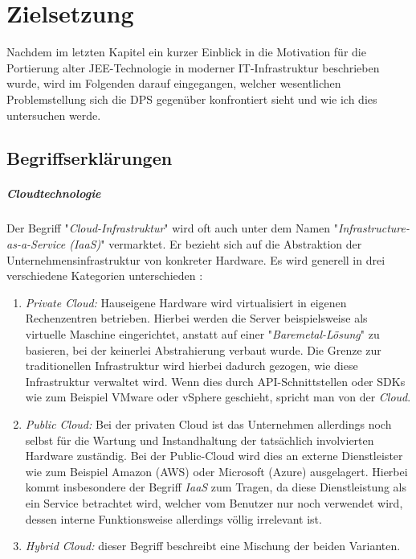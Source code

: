\chapter{Zielsetzung}

Nachdem im letzten Kapitel ein kurzer Einblick in die Motivation für die Portierung alter JEE-Technologie in moderner IT-Infrastruktur beschrieben wurde, wird im Folgenden darauf eingegangen, welcher wesentlichen Problemstellung sich die DPS gegenüber konfrontiert sieht und wie ich dies untersuchen werde.

\section{Begriffserklärungen}

\paragraph{Cloudtechnologie}
Der Begriff "\emph{Cloud-Infrastruktur}" wird oft auch unter dem Namen "\emph{Infrastructure-as-a-Service (IaaS)}" vermarktet. Er bezieht sich auf die Abstraktion der Unternehmensinfrastruktur von konkreter Hardware. Es wird generell in drei verschiedene Kategorien unterschieden \cite[Seite~54]{continuous-delivery}:

\begin{enumerate}
  \item \emph{Private Cloud:} Hauseigene Hardware wird virtualisiert in eigenen Rechenzentren betrieben. Hierbei werden die Server beispielsweise als virtuelle Maschine eingerichtet, anstatt auf einer "\emph{Baremetal-Lösung}" zu basieren, bei der keinerlei Abstrahierung verbaut wurde. Die Grenze zur traditionellen Infrastruktur wird hierbei dadurch gezogen, wie diese Infrastruktur verwaltet wird. Wenn dies durch API-Schnittstellen oder SDKs wie zum Beispiel VMware oder vSphere geschieht, spricht man von der \emph{Cloud}. 
  \item \emph{Public Cloud:} Bei der privaten Cloud ist das Unternehmen allerdings noch selbst für die Wartung und Instandhaltung der tatsächlich involvierten Hardware zuständig. Bei der Public-Cloud wird dies an externe Dienstleister wie zum Beispiel Amazon (AWS) oder Microsoft (Azure) ausgelagert. Hierbei kommt insbesondere der Begriff \emph{IaaS} zum Tragen, da diese Dienstleistung als ein Service betrachtet wird, welcher vom Benutzer nur noch verwendet wird, dessen interne Funktionsweise allerdings völlig irrelevant ist.
  \item \emph{Hybrid Cloud:} dieser Begriff beschreibt eine Mischung der beiden Varianten.
\end{enumerate}

